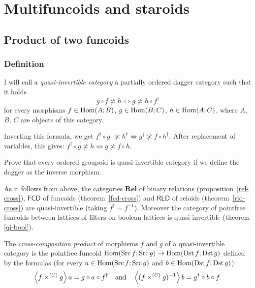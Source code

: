 
\chapter{\label{multi}Multifuncoids and staroids}


\section{Product of two funcoids}


\subsection{Definition}
\begin{defn}
I will call a \emph{quasi-invertible
category} a partially ordered dagger category such that it holds 
\begin{equation}
g\circ f\nasymp h\Leftrightarrow g\nasymp h\circ f^{\dagger}\label{invertible}
\end{equation}
for every morphisms $f\in\operatorname{Hom}(A;B)$, $g\in\operatorname{Hom}(B;C)$, $h\in\operatorname{Hom}(A;C)$,
where $A$, $B$, $C$ are objects of this category.
\end{defn}
Inverting this formula, we get $f^{\dagger}\circ g^{\dagger}\nasymp h^{\dagger}\Leftrightarrow g^{\dagger}\nasymp f\circ h^{\dagger}$.
After replacement of variables, this gives: $f^{\dagger}\circ g\nasymp h\Leftrightarrow g\nasymp f\circ h$.
\begin{xca}
Prove that every ordered groupoid is quasi-invertible category if
we define the dagger as the inverse morphism.
\end{xca}
As it follows from above, the categories $\mathbf{Rel}$ of binary
relations (proposition~\ref{rel-cross}), $\mathsf{FCD}$ of funcoids
(theorem~\ref{fcd-cross}) and $\mathsf{RLD}$ of reloids (theorem~\ref{rld-cross})
are quasi-invertible (taking $f^{\dagger}=f^{-1}$). Moreover the
category of pointfree funcoids between lattices of filters on boolean
lattices is quasi-invertible (theorem \ref{qi-bool}).
\begin{defn}
The \emph{cross-composition product}
of morphisms $f$ and $g$ of a quasi-invertible category is the pointfree
funcoid $\operatorname{Hom}(\operatorname{Src} f;\operatorname{Src} g)\rightarrow\operatorname{Hom}(\operatorname{Dst} f;\operatorname{Dst} g)$ defined
by the formulas (for every $a\in\operatorname{Hom}(\operatorname{Src} f;\operatorname{Src} g)$ and $b\in\operatorname{Hom}(\operatorname{Dst} f;\operatorname{Dst} g)$):
\[
\left\langle f\times^{(C)}g\right\rangle a=g\circ a\circ f^{\dagger}\hspace{1em}\text{and}\hspace{1em}\left\langle (f\times^{(C)}g)^{-1}\right\rangle b=g^{\dagger}\circ b\circ f.
\]

\end{defn}
